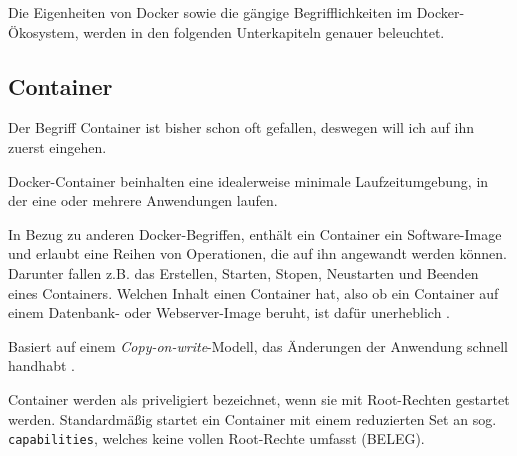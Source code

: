 \documentclass[11pt,a4paper,oneside]{report}
\begin{document}

    Die Eigenheiten von Docker sowie die gängige Begrifflichkeiten im Docker-Ökosystem, werden in den folgenden Unterkapiteln genauer beleuchtet.
    \subsection{Container}

      Der Begriff \glqq{}Container\grqq{} ist bisher schon oft gefallen, deswegen will ich auf ihn zuerst eingehen.

      Docker-Container beinhalten eine idealerweise minimale Laufzeitumgebung, in der eine oder mehrere Anwendungen laufen.

      In Bezug zu anderen Docker-Begriffen, enthält ein Container ein Software-Image und erlaubt eine Reihen von Operationen, die auf ihn angewandt werden können. Darunter fallen z.B. das Erstellen, Starten, Stopen, Neustarten und Beenden eines Containers. Welchen Inhalt einen Container hat, also ob ein Container auf einem Datenbank- oder Webserver-Image beruht, ist dafür unerheblich \cite[S.12]{dockerBook}.

      Basiert auf einem \emph{Copy-on-write}-Modell, das Änderungen der Anwendung schnell handhabt \cite[S.8]{dockerBook}.

      Container werden als priveligiert bezeichnet, wenn sie mit Root-Rechten gestartet werden. Standardmäßig startet ein Container mit einem reduzierten Set an sog. \texttt{capabilities}, welches keine vollen Root-Rechte umfasst (BELEG).

\end{document}
